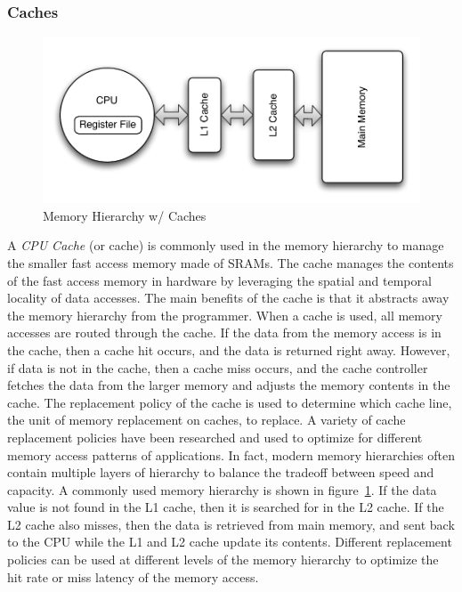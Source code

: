 \subsubsection{Caches}
\begin{figure}
  \vspace{-20pt}
  \begin{center}
    \includegraphics[scale=.5]{figs/conventional_mem_hierarchy}
  \end{center}
  \vspace{-20pt}
  \caption{Memory Hierarchy w/ Caches}
  \label{fig:conventional_mem_hierarchy}
  \vspace{-10pt}
\end{figure}   
A \emph{CPU Cache} (or cache) is commonly used in the memory hierarchy to manage the smaller fast access memory made of SRAMs.
The cache manages the contents of the fast access memory in hardware by leveraging the spatial and temporal locality of data accesses. 
The main benefits of the cache is that it abstracts away the memory hierarchy from the programmer.
When a cache is used, all memory accesses are routed through the cache. 
If the data from the memory access is in the cache, then a cache hit occurs, and the data is returned right away.
However, if data is not in the cache, then a cache miss occurs, and the cache controller fetches the data from the larger memory and adjusts the memory contents in the cache. 
The replacement policy of the cache is used to determine which cache line, the unit of memory replacement on caches, to replace. 
A variety of cache replacement policies have been researched and used to optimize for different memory access patterns of applications. 
In fact, modern memory hierarchies often contain multiple layers of hierarchy to balance the tradeoff between speed and capacity.
A commonly used memory hierarchy is shown in figure~\ref{fig:conventional_mem_hierarchy}.
If the data value is not found in the L1 cache, then it is searched for in the L2 cache. 
If the L2 cache also misses, then the data is retrieved from main memory, and sent back to the CPU while the L1 and L2 cache update its contents.
Different replacement policies can be used at different levels of the memory hierarchy to optimize the hit rate or miss latency of the memory access.


